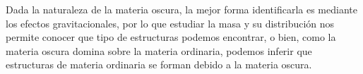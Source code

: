 Dada la naturaleza de la materia oscura, la mejor forma identificarla es mediante los efectos gravitacionales, por lo que estudiar la masa y su distribución nos permite conocer que tipo de estructuras podemos encontrar, o bien, como la materia oscura domina sobre la materia ordinaria, podemos inferir que estructuras de materia ordinaria se forman debido a la materia oscura.

%
%
%
